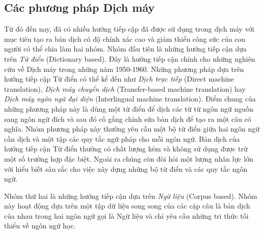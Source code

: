 

\subsection{Các phương pháp Dịch máy}
Từ đó đến nay, đã có nhiều hướng tiếp cập đã được sử dụng trong dịch máy với mục tiêu tạo ra bản dịch có độ chính xác cao và giảm thiểu công sức của con người có thể chia làm hai nhóm. Nhóm đầu tiên là những hướng tiếp cận dựa trên \textit{Từ điển} (Dictionary based). Đây là hướng tiếp cận chính cho những nghiên cứu về Dịch máy trong những năm 1950-1960. Những phương pháp dựa trên hướng tiếp cập Từ điển có thể kể đến như \textit{Dịch trực tiếp} (Direct machine translation), \textit{Dịch máy chuyển dịch} (Transfer-based machine translation) hay \textit{Dịch máy ngôn ngữ đại diện} (Interlingual machine translation). Điểm chung của những phương pháp này là dùng một từ điển để dịch các từ từ ngôn ngữ nguồn sang ngôn ngữ đích và sau đó cố gắng chỉnh sửa bản dịch để tạo ra một câu có nghĩa. Nhóm phương pháp này thường yêu cầu một bộ từ điển giữa hai ngôn ngữ cần dịch và một tập các quy tắc ngữ pháp cho mỗi ngôn ngữ. Bản dịch của hướng tiếp cận Từ điển thường có chất lượng kém và không sử dụng được trừ một số trường hợp đặc biệt. Ngoài ra chúng còn đòi hỏi một lượng nhân lực lớn với hiểu biết sâu sắc cho việc xây dựng những bộ từ điển và các quy tắc ngôn ngữ. 

Nhóm thứ hai là những hướng tiếp cận dựa trên \textit{Ngữ liệu} (Corpus based). Nhóm này hoạt động dựa trên một tập dữ liệu song song của các cặp câu là bản dịch của nhau trong hai ngôn ngữ gọi là Ngữ liệu và chỉ yêu cầu những tri thức tối thiểu về ngôn ngữ học.


